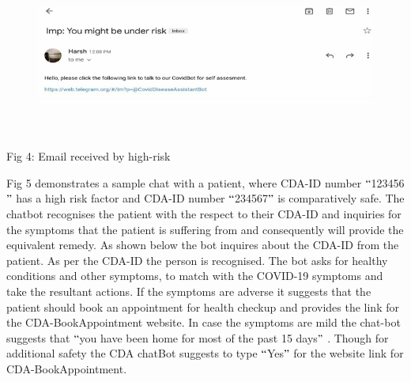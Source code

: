 \documentclass[12pt]{article}
\begin{document}

\begin{figure}[H]
	\begin{Center}
		\includegraphics[width=6.3in,height=2.09in]{./media/image9.png}
	\end{Center}
\end{figure}



\begin{Center}
Fig 4: Email received by high-risk
\end{Center}
\begin{justify}
Fig 5 demonstrates a sample chat with a patient, where CDA-ID number $``$123456$"$  has a high risk factor and CDA-ID number $``$234567$"$  is comparatively safe. The chatbot recognises the patient with the respect to their CDA-ID and inquiries for the symptoms that the patient is suffering from and consequently will provide the equivalent remedy. As shown below the bot inquires about the CDA-ID from the patient. As per the CDA-ID the person is recognised. The bot asks for healthy conditions and other symptoms, to match with the COVID-19 symptoms and take the resultant actions. If the symptoms are adverse it suggests that the patient should book an appointment for health checkup and provides the link for the CDA-BookAppointment website. In case the symptoms are mild the chat-bot suggests that $``$you have been home for most of the past 15 days$"$ . Though for additional safety the CDA chatBot suggests to type $``$Yes$"$  for the website link for CDA-BookAppointment.
\end{justify}


\end{document}
